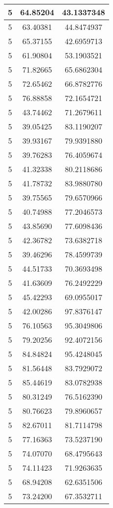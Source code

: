 \documentclass[
]{book}
\begin{document}
\begin{tabular}{c|c|c}
\hline
5 & 64.85204 & 43.1337348\\
\hline
5 & 63.40381 & 44.8474937\\
\hline
5 & 65.37155 & 42.6959713\\
\hline
5 & 61.90804 & 53.1903521\\
\hline
5 & 71.82665 & 65.6862304\\
\hline
5 & 72.65462 & 66.8782776\\
\hline
5 & 76.88858 & 72.1654721\\
\hline
5 & 43.74462 & 71.2679611\\
\hline
5 & 39.05425 & 83.1190207\\
\hline
5 & 39.93167 & 79.9391880\\
\hline
5 & 39.76283 & 76.4059674\\
\hline
5 & 41.32338 & 80.2118686\\
\hline
5 & 41.78732 & 83.9880780\\
\hline
5 & 39.75565 & 79.6570966\\
\hline
5 & 40.74988 & 77.2046573\\
\hline
5 & 43.85690 & 77.6098436\\
\hline
5 & 42.36782 & 73.6382718\\
\hline
5 & 39.46296 & 78.4599739\\
\hline
5 & 44.51733 & 70.3693498\\
\hline
5 & 41.63609 & 76.2492229\\
\hline
5 & 45.42293 & 69.0955017\\
\hline
5 & 42.00286 & 97.8376147\\
\hline
5 & 76.10563 & 95.3049806\\
\hline
5 & 79.20256 & 92.4072156\\
\hline
5 & 84.84824 & 95.4248045\\
\hline
5 & 81.56448 & 83.7929072\\
\hline
5 & 85.44619 & 83.0782938\\
\hline
5 & 80.31249 & 76.5162390\\
\hline
5 & 80.76623 & 79.8960657\\
\hline
5 & 82.67011 & 81.7114798\\
\hline
5 & 77.16363 & 73.5237190\\
\hline
5 & 74.07070 & 68.4795643\\
\hline
5 & 74.11423 & 71.9263635\\
\hline
5 & 68.94208 & 62.6351506\\
\hline
5 & 73.24200 & 67.3532711\\

\end{tabular}
\end{document}

